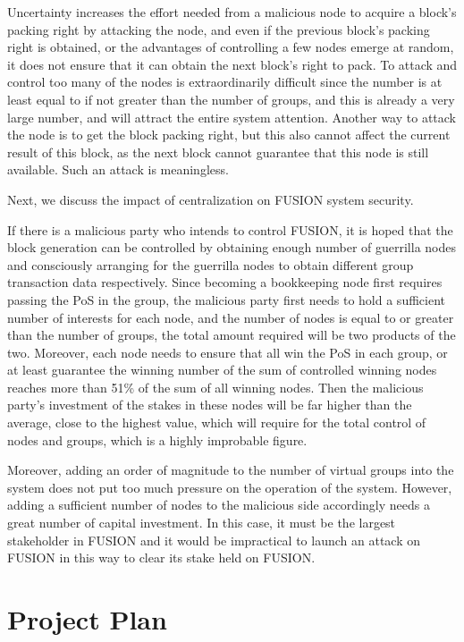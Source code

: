 \documentclass[a4paper,12pt]{article}
\begin{document}
Uncertainty increases the effort needed from a malicious node to acquire a block's packing right by attacking the node, and even if the previous block's packing right is obtained, or the advantages of controlling a few nodes emerge at random, it does not ensure that it can obtain the next block's right to pack. To attack and control too many of the nodes is extraordinarily difficult since the number is at least equal to if not greater than the number of groups, and this is already a very large number, and will attract the entire system attention. Another way to attack the node is to get the block packing right, but this also cannot affect the current result of this block, as the next block cannot guarantee that this node is still available. Such an attack is meaningless.

Next, we discuss the impact of centralization on FUSION system security.

If there is a malicious party who intends to control FUSION, it is hoped that the block generation can be controlled by obtaining enough number of guerrilla nodes and consciously arranging for the guerrilla nodes to obtain different group transaction data respectively. Since becoming a bookkeeping node first requires passing the PoS in the group, the malicious party first needs to hold a sufficient number of interests for each node, and the number of nodes is equal to or greater than the number of groups, the total amount required will be two products of the two. Moreover, each node needs to ensure that all win the PoS in each group, or at least guarantee the winning number of the sum of controlled winning nodes reaches more than 51\% of the sum of all winning nodes. Then the malicious party's investment of the stakes in these nodes will be far higher than the average, close to the highest value, which will require for the total control of nodes and groups, which is a highly improbable figure. 

Moreover, adding an order of magnitude to the number of virtual groups into the system does not put too much pressure on the operation of the system. However, adding a sufficient number of nodes to the malicious side accordingly needs a great number of capital investment. In this case, it must be the largest stakeholder in FUSION and it would be impractical to launch an attack on FUSION in this way to clear its stake held on FUSION.

\section{Project Plan}
\end{document}
